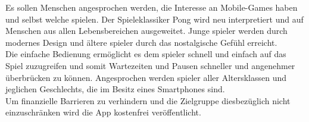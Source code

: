 Es sollen Menschen angesprochen werden, die Interesse an Mobile-Games haben und selbst welche spielen.
Der Spieleklassiker Pong wird neu interpretiert und auf Menschen aus allen Lebensbereichen ausgeweitet.
Junge \gls{spieler} werden durch modernes Design und ältere \gls{spieler} durch das nostalgische Gefühl erreicht.
\\
Die einfache Bedienung ermöglicht es dem \gls{spieler} schnell und einfach auf das Spiel zuzugreifen 
und somit Wartezeiten und Pausen schneller und angenehmer überbrücken zu können.
Angesprochen werden \gls{spieler} aller Altersklassen und jeglichen Geschlechts, die im Besitz eines Smartphones sind.
\\
Um finanzielle Barrieren zu verhindern und die Zielgruppe diesbezüglich nicht einzuschränken wird die App kostenfrei veröffentlicht.
